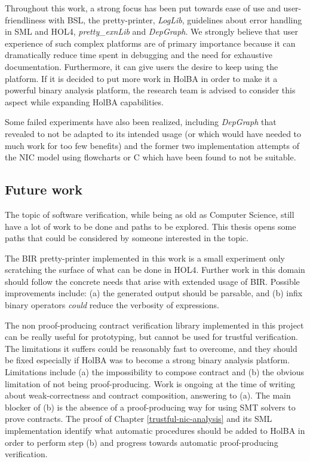 \documentclass[10pt,a4paper]{article}
\begin{document}
\begin{multicols}{2}
Throughout this work, a strong focus has been put towards ease of use and user-friendliness with BSL, the pretty-printer, \textit{LogLib}, guidelines about error handling in SML and HOL4, \textit{pretty\_exnLib} and \textit{DepGraph}. We strongly believe that user experience of such complex platforms are of primary importance because it can dramatically reduce time spent in debugging and the need for exhaustive documentation. Furthermore, it can give users the desire to keep using the platform. If it is decided to put more work in HolBA in order to make it a powerful binary analysis platform, the research team is advised to consider this aspect while expanding HolBA capabilities.

Some failed experiments have also been realized, including \textit{DepGraph} that revealed to not be adapted to its intended usage (or which would have needed to much work for too few benefits) and the former two implementation attempts of the NIC model using flowcharts or C which have been found to not be suitable.

\subsection{Future work}

The topic of software verification, while being as old as Computer Science, still have a lot of work to be done and paths to be explored. This thesis opens some paths that could be considered by someone interested in the topic.

The BIR pretty-printer implemented in this work is a small experiment only scratching the surface of what can be done in HOL4. Further work in this domain should follow the concrete needs that arise with extended usage of BIR. Possible improvements include: (a) the generated output should be parsable, and (b) infix binary operators \textit{could} reduce the verbosity of expressions.

The non proof-producing contract verification library implemented in this project can be really useful for prototyping, but cannot be used for trustful verification. The limitations it suffers could be reasonably fast to overcome, and they should be fixed especially if HolBA was to become a strong binary analysis platform. Limitations include (a) the impossibility to compose contract and (b) the obvious limitation of not being proof-producing. Work is ongoing at the time of writing about weak-correctness and contract composition, answering to (a). The main blocker of (b) is the absence of a proof-producing way for using SMT solvers to prove contracts. The proof of Chapter \ref{trustful-nic-analysis} and its SML implementation identify what automatic procedures should be added to HolBA in order to perform step (b) and progress towards automatic proof-producing verification.


\end{multicols}
\end{document}
